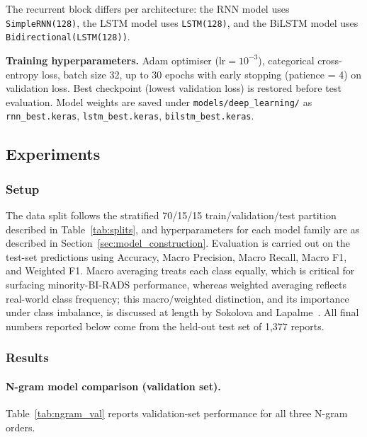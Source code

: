 \documentclass[11pt,a4paper]{article}
\begin{document}
The recurrent block differs per architecture: the RNN model uses
\texttt{SimpleRNN(128)}, the LSTM model uses \texttt{LSTM(128)}, and the
BiLSTM model uses \texttt{Bidirectional(LSTM(128))}.

\textbf{Training hyperparameters.}
Adam optimiser ($\text{lr} = 10^{-3}$), categorical cross-entropy loss,
batch size 32, up to 30 epochs with early stopping (patience = 4)
on validation loss.
Best checkpoint (lowest validation loss) is restored before test evaluation.
Model weights are saved under \texttt{models/deep\_learning/} as
\texttt{rnn\_best.keras}, \texttt{lstm\_best.keras}, \texttt{bilstm\_best.keras}.

\subsection{Experiments}

\subsubsection{Setup}

The data split follows the stratified 70/15/15 train/validation/test
partition described in Table~\ref{tab:splits}, and hyperparameters for each
model family are as described in Section~\ref{sec:model_construction}.
Evaluation is carried out on the test-set predictions using Accuracy, Macro
Precision, Macro Recall, Macro F1, and Weighted F1. Macro averaging treats
each class equally, which is critical for surfacing minority-BI-RADS
performance, whereas weighted averaging reflects real-world class frequency;
this macro/weighted distinction, and its importance under class imbalance, is
discussed at length by Sokolova and Lapalme~\cite{sokolova2009systematic}.
All final numbers reported below come from the held-out test set of
1{,}377 reports.

\subsubsection{Results}
\label{sec:results}

\paragraph{N-gram model comparison (validation set).}

Table~\ref{tab:ngram_val} reports validation-set performance for all three
N-gram orders.
\end{document}
